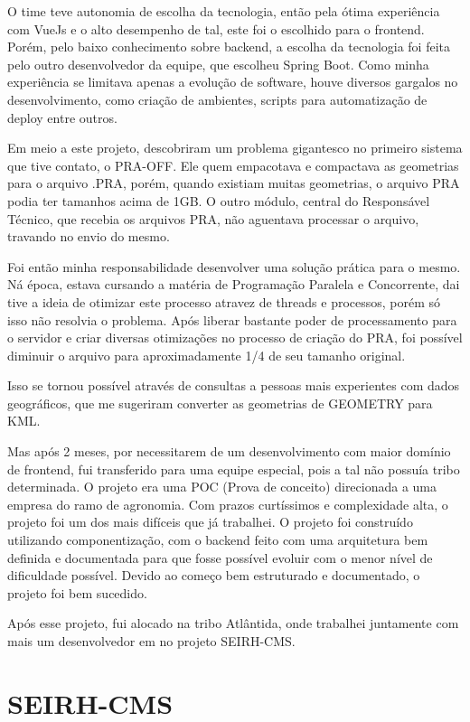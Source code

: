 O time teve autonomia de escolha da tecnologia, então pela ótima experiência com VueJs e o alto desempenho de tal, este foi o escolhido para o frontend.
Porém, pelo baixo conhecimento sobre backend, a escolha da tecnologia foi feita pelo outro desenvolvedor da equipe, que escolheu Spring Boot.
Como minha experiência se limitava apenas a evolução de software, houve diversos gargalos no desenvolvimento, como criação de ambientes, scripts para automatização de deploy entre outros.

Em meio a este projeto, descobriram um problema gigantesco no primeiro sistema que tive contato, o PRA-OFF. Ele quem empacotava e compactava as geometrias para o arquivo .PRA, porém, quando existiam muitas geometrias, o arquivo PRA podia ter tamanhos acima de 1GB.
O outro módulo, central do Responsável Técnico, que recebia os arquivos PRA, não aguentava processar o arquivo, travando no envio do mesmo.

Foi então minha responsabilidade desenvolver uma solução prática para o mesmo. Ná época, estava cursando a matéria de Programação Paralela e Concorrente, dai tive a ideia de otimizar este processo atravez de threads e processos, porém só isso não resolvia o problema.
Após liberar bastante poder de processamento para o servidor e criar diversas otimizações no processo de criação do PRA, foi possível diminuir o arquivo para aproximadamente 1/4 de seu tamanho original.

Isso se tornou possível através de consultas a pessoas mais experientes com dados geográficos, que me sugeriram converter as geometrias de GEOMETRY para KML.

Mas após 2 meses, por necessitarem de um desenvolvimento com maior domínio de frontend, fui transferido para uma equipe especial, pois a tal não possuía tribo determinada.
O projeto era uma POC (Prova de conceito) direcionada a uma empresa do ramo de agronomia. Com prazos curtíssimos e complexidade alta, o projeto foi um dos mais difíceis que já trabalhei.
O projeto foi construído utilizando componentização, com o backend feito com uma arquitetura bem definida e documentada para que fosse possível evoluir com o menor nível de dificuldade possível. Devido ao começo bem estruturado e documentado, o projeto foi bem sucedido.

Após esse projeto, fui alocado na tribo Atlântida, onde trabalhei juntamente com mais um desenvolvedor em no projeto SEIRH-CMS.

\section{SEIRH-CMS}

